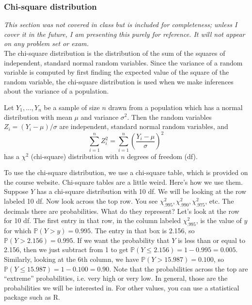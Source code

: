 \documentclass[12pt]{article}
\theoremstyle{definition}
\theoremstyle{remark}
\def\P{{\mathbb P}}
\begin{document}
\subsubsection{Chi-square distribution}

\emph{This section was not covered in class but is included for completeness; unless I cover it in the future, I am presenting this purely for reference. It will not appear on any problem set or exam.} \\

The chi-square distribution is the distribution of the sum of the squares of independent, standard normal random variables. Since the variance of a random variable is computed by first finding the expected value of the square of the random variable, the chi-square distribution is used when we make inferences about the variance of a population. 

\begin{framed}
Let $Y_1, \dots, Y_n$ be a sample of size $n$ drawn from a population which has a normal distribution with mean $\mu$ and variance $\sigma^2$. Then the random variables $Z_i = (Y_i - \mu)/\sigma$ are independent, standard normal random variables, and
\[
\sum_{i=1}^n Z_i^2 = \sum_{i=1}^n \left( \frac{Y_i - \mu}{\sigma}\right)^2
\]
has a $\chi^2$ (chi-square) distribution with $n$ degrees of freedom (df).
\end{framed}

To use the chi-square distribution, we use a chi-square table, which is provided on the course website. Chi-square tables are a little weird. Here's how we use them. Suppose $Y$ has a chi-square distribution with 10 df. We will be looking at the row labeled 10 df. Now look across the top row. You see $\chi^2_{.995}, \chi^2_{.990}, \chi^2_{.975}$, etc. The decimals there are probabilities. What do they represent? Let's look at the row for 10 df. The first entry in that row, in the column labeled $\chi^2_{.995}$, is the value of $y$ for which $\P(Y > y) = 0.995$. The entry in that box is 2.156, so $\P(Y > 2.156) = 0.995$. If we want the probability that $Y$ is less than or equal to 2.156, then we just subtract from 1 to get $\P(Y \leq 2.156) = 1 - 0.995 = 0.005$. Similarly, looking at the 6th column, we have $\P(Y > 15.987) = 0.100$, so $\P(Y \leq 15.987) = 1 - 0.100 = 0.90$. Note that the probabilities across the top are ``extreme'' probabilities, i.e. very high or very low. In general, those are the probabilities we will be interested in. For other values, you can use a statistical package such as R.\\
\end{document}
